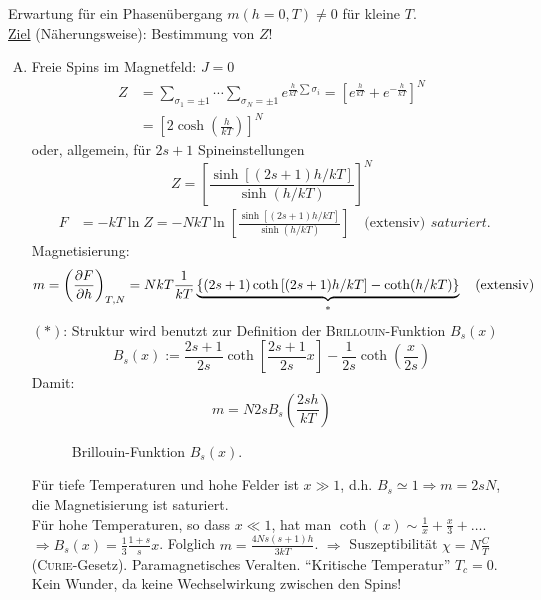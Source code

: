 Erwartung für ein Phasenübergang $m(h=0, T) \neq 0$ für kleine $T$. \\
\underline{Ziel} (Näherungsweise): Bestimmung von $Z$!
\begin{enumerate}[A)]
    \item Freie Spins im Magnetfeld: $J = 0$
    \begin{equation}
        \begin{split}
            Z &= \sum_{\sigma_1 = \pm 1} \cdots \sum_{\sigma_N = \pm 1} e^{ \frac{h}{kT} \sum \sigma_i } = \left[ e^{\frac{h}{kT}} + e^{-\frac{h}{kT}} \right]^N \\
            &= \left[2 \cosh \left( \frac{h}{kT} \right) \right]^N
        \end{split}
    \end{equation}
    oder, allgemein, für $2s+1$ Spineinstellungen
    \begin{equation}
        Z = \left[ \frac{\sinh \left[ (2s+1) h / kT \right]}{\sinh (h/kT)} \right]^N
    \end{equation}
    \begin{equation}
        \begin{split}
            F &= - k T \ln Z = - N k T \ln \left[  \frac{\sinh \left[ (2s+1) h / kT \right]}{\sinh (h/kT)} \right] \quad \text{(extensiv)}
        \end{split}saturiert.
    \end{equation}
    Magnetisierung:
    \begin{equation}
        m = \left( \frac{\partial F}{\partial h} \right)_{T, N} = N k T \frac{1}{k T} \underbrace{\left\{ (2s+1) \coth \left[ (2s+1) h/kT \right] - \coth(h/kT)  \right\}}_{*} \quad \text{(extensiv)}
    \end{equation}
    $(*)$: Struktur wird benutzt zur Definition der \textsc{Brillouin}-Funktion $B_s(x)$
    \begin{equation}
        B_s(x) := \frac{2s+1}{2s} \coth \left[ \frac{2s+1}{2s} x \right] - \frac{1}{2s} \coth \left( \frac{x}{2s} \right)
    \end{equation}
    Damit:
    \begin{equation}
        m = N 2 s B_s \left( \frac{2 s h}{k T} \right)
    \end{equation}
    \begin{figure}[H]
        \centering
        \def\svgwidth{0.5\textwidth}
        
        \caption{Brillouin-Funktion $B_s(x)$.}
        \label{img:BrillouinFkt}
\end{figure}
    Für tiefe Temperaturen und hohe Felder ist $x \gg 1$, d.h. $B_s \simeq 1 \Rightarrow m = 2 s N$, die Magnetisierung ist saturiert. \\
    Für hohe Temperaturen, so dass $x \ll 1$, hat man $\coth(x) \sim \frac{1}{x} + \frac{x}{3} + \ldots$.
    $\Rightarrow B_s(x) = \frac{1}{3} \frac{1+s}{s} x$. Folglich $m = \frac{4 N s (s+1) h}{3 k T}$. $\Rightarrow$ Suszeptibilität $\chi = N \frac{C}{T}$ (\textsc{Curie}-Gesetz).
    Paramagnetisches Veralten. "`Kritische Temperatur"' $T_c = 0$. Kein Wunder, da keine Wechselwirkung zwischen den Spins!
    

\end{enumerate}
